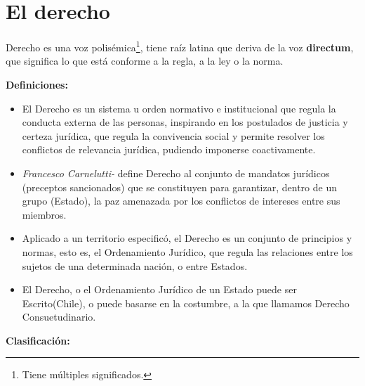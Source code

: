 \documentclass{templateApunte}
\newcommand{\newparagraph}{\par\vspace{\baselineskip}\noindent}
\begin{document}
\newpage
\section{El derecho}
Derecho es una voz polisémica\footnote{Tiene múltiples significados.}, tiene raíz latina que deriva de la voz \textbf{directum}, que significa lo que est\'a conforme a la regla, a la ley o la norma.
\newparagraph
\textbf{Definiciones:}
\begin{itemize}
  \item El Derecho es un sistema u orden normativo e institucional que regula la conducta externa de las personas, inspirando en los postulados de justicia y certeza jurídica, que regula la convivencia social y permite resolver los conflictos de relevancia jurídica, pudiendo imponerse coactivamente.
  \item \textit{Francesco Carnelutti-} define Derecho al conjunto de mandatos jurídicos (preceptos sancionados) que se constituyen para garantizar, dentro de un grupo (Estado), la paz amenazada por los conflictos de intereses entre sus miembros.
  \item Aplicado a un territorio especificó, el Derecho es un conjunto de principios y normas, esto es, el Ordenamiento Jurídico, que regula las relaciones entre los sujetos de una determinada nación, o entre Estados.
  \item El Derecho, o el Ordenamiento Jurídico de un Estado puede ser Escrito(Chile), o puede basarse en la costumbre, a la que llamamos Derecho Consuetudinario.
\end{itemize}
\noindent \textbf{Clasificación:}
\end{document}
